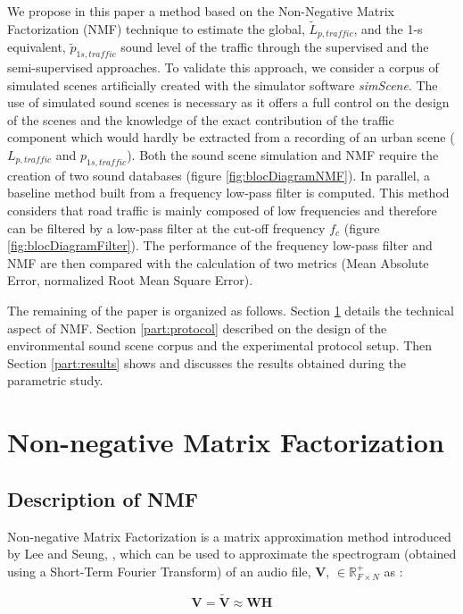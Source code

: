 \documentclass[twocolumn,a4paper,10pt]{article}
\newcommand{\ml}[1]{\textcolor{blue}{ Mathieu: #1}}
\begin{document}
We propose in this paper a method based on the Non-Negative Matrix Factorization (NMF) technique to estimate the global, $\tilde{L}_{p,traffic}$, and the 1-s equivalent, $\tilde{p}_{1s,traffic}$ sound level of the traffic through the supervised and the semi-supervised approaches. To validate this approach, we consider a corpus of simulated scenes artificially created with the simulator software \textit{simScene}. The use of simulated sound scenes is necessary as it offers a full control on the design of the scenes and the knowledge of the exact contribution of the traffic component which would hardly be extracted from a recording of an urban scene ($L_{p,traffic}$ and $p_{1s,traffic}$). Both the sound scene simulation and NMF require the creation of two sound databases (figure  \ref{fig:blocDiagramNMF}). In parallel, a baseline method built from a frequency low-pass filter is computed. This method considers that road traffic is mainly composed of low frequencies and therefore can be filtered by a low-pass filter at the cut-off frequency $f_c$ (figure \ref{fig:blocDiagramFilter}). The performance of the frequency low-pass filter and NMF are then compared with the calculation of two metrics (Mean Absolute Error, normalized Root Mean Square Error). 

The remaining of the paper is organized as follows. Section \ref{part:nmf} details the technical aspect of NMF. Section \ref{part:protocol} described on the design of the environmental sound scene corpus and the experimental protocol setup. Then Section \ref{part:results} shows and discusses the results obtained during the parametric study.


\section{Non-negative Matrix Factorization}\label{part:nmf}
\subsection{Description of NMF}
Non-negative Matrix Factorization is a matrix approximation method introduced by Lee and Seung, \cite{lee_learning_1999}, which can be used to approximate the spectrogram (obtained using a Short-Term Fourier Transform) of an audio file, $\mathbf{V}$, $\in \mathbb{R}^+_{F \times N}$ as :

\begin{equation}\label{eq:nmf}
\mathbf{V} = \mathbf{\tilde{V}} \approx \mathbf{WH}
\end{equation}
\end{document}
